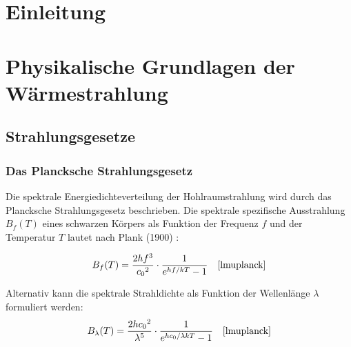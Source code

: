 \documentclass[12pt,a4paper]{article}
\begin{document}



\setcounter{page}{2}
\tableofcontents
\newpage





\section{Einleitung}

\section{Physikalische Grundlagen der Wärmestrahlung}

\subsection{Strahlungsgesetze}

\subsubsection{Das Plancksche Strahlungsgesetz}
Die spektrale Energiedichteverteilung der Hohlraumstrahlung wird durch das Plancksche Strahlungsgesetz beschrieben.
Die spektrale spezifische Ausstrahlung $B_f(T)$ eines schwarzen Körpers als Funktion der Frequenz $f$ und der Temperatur $T$
lautet nach Plank (1900) \cite{plancknormalspektrum}\cite{plancknormalspektrumtheorie}:

\begin{equation}
  \label{Spektrale Strahldichte als Funktion der Wellenlänge}
    B_f(T) = \frac{2hf^3}{{c_0}^2} \cdot \frac{1}{e^{hf/kT}-1} \quad \text{\cite{lmuplanck}}
\end{equation}


Alternativ kann die spektrale Strahldichte als Funktion der Wellenlänge $\lambda$ formuliert werden:
\begin{equation}
  \label{Spektrale Strahldichte als Funktion der Wellenlänge}
    B_{\lambda}(T) = \frac{2h{c_0}^2}{\lambda^5}\cdot \frac{1}{e^{hc_0/\lambda kT}-1} \quad \text{\cite{lmuplanck}}
\end{equation}
\end{document}
